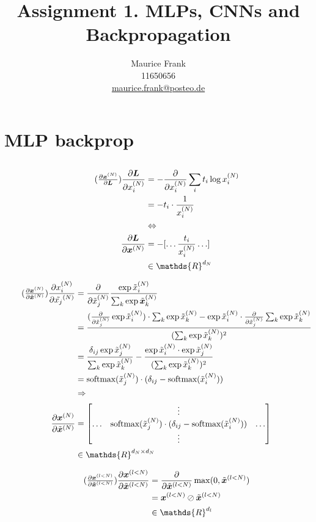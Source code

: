 \documentclass{article}
\title{Assignment 1. MLPs, CNNs and Backpropagation}
\author{%
  Maurice Frank\\
  11650656\\
  \href{mailto:maurice.frank@posteo.de}{maurice.frank@posteo.de} \\
}
\newcommand\bM[1]{\ensuremath{\begin{bmatrix}#1\end{bmatrix}}}
\newcommand\·{\ensuremath{\cdot}}
\newcommand\…{\ensuremath{\ldots}}
\renewcommand\t{\ensuremath{\times}}
\newcommand{\LRA}{\ensuremath{\Leftrightarrow}}
\newcommand\f[2]{\ensuremath{\frac{#1}{#2}}}
\newcommand\pf[2]{\ensuremath{\frac{\partial {#1}}{\partial {#2}}}}
\newcommand*{\B}[1]{\ifmmode\bm{#1}\else\textbf{#1}\fi}
\newcommand\1{\ensuremath{\mathds{1}}}
\newcommand\R{\ensuremath{\mathds{R}}}
\begin{document}
\maketitle
\section{MLP backprop}
\subsection{}
\subsubsection{}
\begin{align*}
  \tag{$\pf{\B{x}^{(N)}}{\B{L}}$}
  \pf{\B{L}}{x_i^{(N)}}
  &= -\pf{}{x_i^{(N)}}\sum_i t_i \log x_i^{(N)}\\
  &= -t_i\·\f{1}{x_i^{(N)}}\\
  &\LRA\\
  \pf{\B{L}}{\B{x}^{(N)}}
  &= -[\hdots \f{t_i}{x_i^{(N)}}\hdots]\\
  &\in\R^{d_N}
\end{align*}

\begin{align*}
  \tag{$\pf{\B{x}^{(N)}}{\tilde{\B{x}}^{(N)}}$}
  \pf{x_i^{(N)}}{\tilde{x_j}^{(N)}}
  &= \pf{}{\tilde{x}_j^{(N)}}\f{\exp{\tilde{x}_i^{(N)}}}{\sum_k \exp{\tilde{\B{x}}_k^{(N)}}}\\
  &= \f{(\pf{}{\tilde{x}^{(N)}_j}\exp{\tilde{x}^{(N)}_i})\·\sum_k\exp{\tilde{x}^{(N)}_k} - \exp{\tilde{x}^{(N)}_i}\·\pf{}{\tilde{x}^{(N)}_j}\sum_k\exp{\tilde{x}^{(N)}_k}}{(\sum_k\exp{\tilde{x}^{(N)}_k})^2}\\
  &= \f{\delta_{ij}\exp{\tilde{x}^{(N)}_j}}{\sum_k\exp{\tilde{x}^{(N)}_k}} - \f{\exp{\tilde{x}^{(N)}_i}\·\exp{\tilde{x}^{(N)}_j}}{(\sum_k\exp{\tilde{x}^{(N)}_k})^2}\\
  &= \text{softmax}(\tilde{x}^{(N)}_j)\·(\delta_{ij} - \text{softmax}(\tilde{x}^{(N)}_i))\\
  &\Rightarrow\\
  \pf{\B{x}^{(N)}}{\tilde{\B{x}}^{(N)}} &= \bM{& \vdots &\\\hdots & \text{softmax}(\tilde{x}^{(N)}_j)\·(\delta_{ij} - \text{softmax}(\tilde{x}^{(N)}_i)) & \hdots\\ & \vdots &}\\
  &\in\R^{d_N\t d_N}
\end{align*}

\begin{align*}
  \tag{$\pf{\B{x}^{(l<N)}}{\tilde{\B{x}}^{(l<N)}}$}
  \pf{\B{x}^{(l<N)}}{\tilde{\B{x}}^{(l<N)}}
  &= \pf{}{\tilde{\B{x}}^{(l<N)}}\max(0,\tilde{\B{x}}^{(l<N)})\\
  &= \B{x}^{(l<N)}\oslash\tilde{\B{x}}^{(l<N)}\\
  &\in\R^{d_l}
\end{align*}
\end{document}
